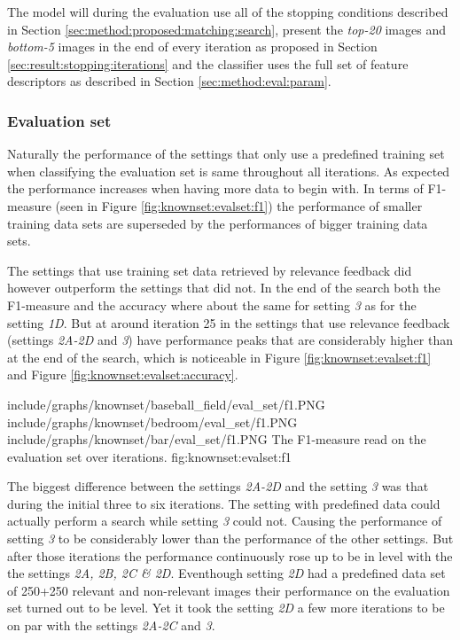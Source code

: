 The model will during the evaluation use all of the stopping conditions described in Section \ref{sec:method:proposed:matching:search}, present the \emph{top-20} images and \emph{bottom-5} images in the end of every iteration as proposed in Section \ref{sec:result:stopping:iterations} and the classifier uses the full set of feature descriptors as described in Section \ref{sec:method:eval:param}. 

\subsubsection{Evaluation set}
\label{sec:res:knownset:eval}
Naturally the performance of the settings that only use a predefined training set when classifying the evaluation set is same throughout all iterations. As expected the performance increases when having more data to begin with. In terms of F1-measure (seen in Figure \ref{fig:knownset:evalset:f1}) the performance of smaller training data sets are superseded by the performances of bigger training data sets. 


The settings that use training set data retrieved by relevance feedback did however outperform the settings that did not. In the end of the search both the F1-measure and the accuracy where about the same for setting \emph{3} as for the setting \emph{1D}. But at around iteration 25 in the settings that use relevance feedback (settings \emph{2A-2D} and \emph{3}) have performance peaks that are considerably higher than at the end of the search, which is noticeable in Figure \ref{fig:knownset:evalset:f1} and Figure \ref{fig:knownset:evalset:accuracy}.

\tripfigurenear
{include/graphs/knownset/baseball_field/eval_set/f1.PNG}
{include/graphs/knownset/bedroom/eval_set/f1.PNG}
{include/graphs/knownset/bar/eval_set/f1.PNG}
{The F1-measure read on the evaluation set over iterations.}
{fig:knownset:evalset:f1}

The biggest difference between the settings \emph{2A-2D} and the setting \emph{3} was that during the initial three to six iterations. The setting with predefined data could actually perform a search while setting \emph{3} could not. Causing the performance of setting \emph{3} to be considerably lower than the performance of the other settings. But after those iterations the performance continuously rose up to be in level with the the settings \emph{2A, 2B, 2C \& 2D}. Eventhough setting \emph{2D} had a predefined data set of 250+250 relevant and non-relevant images their performance on the evaluation set turned out to be level. Yet it took the setting \emph{2D} a few more iterations to be on par with the settings \emph{2A-2C} and \emph{3}.

